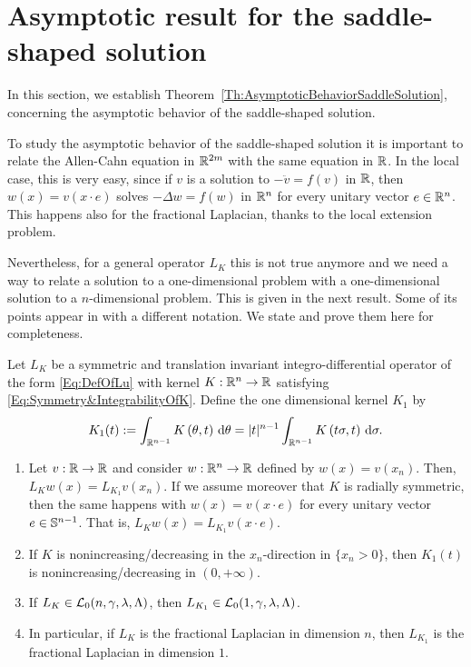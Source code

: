 \section{Asymptotic result for the saddle-shaped solution}
\label{Sec:Asymptotic}

In this section, we establish Theorem~\ref{Th:AsymptoticBehaviorSaddleSolution}, concerning the asymptotic behavior of the saddle-shaped solution. 



To study the asymptotic behavior of the saddle-shaped solution it is important to relate the Allen-Cahn equation in $\mathbb{R}^{2m}$ with the same equation in $\mathbb{R}$. In the local case, this is very easy, since if $v$ is a solution to $-\ddot{v} = f(v)$ in $\mathbb{R}$,  then $w(x) = v(x\cdot e)$ solves $-\Delta w = f(w)$ in $\mathbb{R}^n$ for every unitary vector $e\in \mathbb{R}^n$. This happens also for the fractional Laplacian, thanks to the local extension problem.

Nevertheless, for a general operator $L_K$ this is not true anymore and we need a way to relate a solution to a one-dimensional problem with a one-dimensional solution to a $n$-dimensional problem. This is given in the next result. Some of its points appear in \cite{CozziPassalacqua} with a different notation. We state and prove them here for completeness.

\begin{proposition}
	\label{Prop:KernelsDimension}
	Let $L_K $ be a symmetric and translation invariant integro-differential operator of the form \eqref{Eq:DefOfLu} with kernel $K:\mathbb{R}^n \to \mathbb{R}$ satisfying \eqref{Eq:Symmetry&IntegrabilityOfK}. Define the one dimensional kernel $K_1$ by
	\begin{equation}
	\label{Eq:OneDimKernel}
	K_1(t) := \int_{\mathbb{R}^{n-1}} K\left(\theta,t\right) \,\mathrm{d} \theta = |t|^{n-1} \int_{\mathbb{R}^{n-1}} K\left(t\sigma,t\right) \,\mathrm{d} \sigma.
	\end{equation}
	\begin{enumerate}[label=(\roman{*})]
		\item Let $v:\mathbb{R}\to\mathbb{R}$ and consider $w:\mathbb{R}^n\to\mathbb{R}$ defined by $w(x) = v(x_n)$. Then, $L_K w(x) = L_{K_1} v(x_n)$. If we assume moreover that $K$ is radially symmetric, then the same happens with $w(x) = v(x\cdot e)$ for every unitary vector $e\in \mathbb{S}^{n-1}$. That is, $L_K w(x) = L_{K_1} v(x \cdot e)$.
		\item  If $K$ is nonincreasing/decreasing in  the $x_n$-direction in $\{x_n>0\}$, then $K_1(t)$ is nonincreasing/decreasing in $(0,+\infty)$.
		\item If $L_K \in \mathcal{L}_0 (n,\gamma,\lambda,\Lambda)$, then   $L_{K_1} \in \mathcal{L}_0 (1,\gamma,\lambda,\Lambda)$.
		\item In particular, if $L_K $ is the fractional Laplacian in dimension $n$, then $L_{K_1}$ is the fractional Laplacian in dimension $1$.
		
	\end{enumerate}
\end{proposition}

